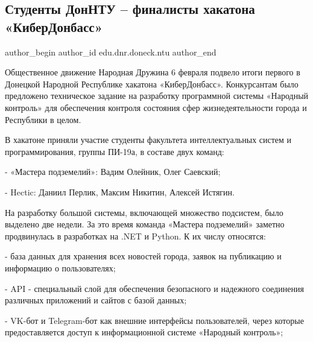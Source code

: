  
 
 
 
 
 
\subsection{Студенты ДонНТУ – финалисты хакатона «КиберДонбасс»}
\label{sec:16_02_2022.stz.edu.dnr.doneck.ntu.1.hakaton_studenty}
 
\ifcmt
 author_begin
   author_id edu.dnr.doneck.ntu
 author_end
\fi

Общественное движение Народная Дружина 6 февраля подвело итоги первого в
Донецкой Народной Республике хакатона «КиберДонбасс». Конкурсантам было
предложено техническое задание на разработку программной системы «Народный
контроль» для обеспечения контроля состояния сфер жизнедеятельности города и
Республики в целом.


В хакатоне приняли участие студенты факультета интеллектуальных систем и
программирования, группы ПИ-19а, в составе двух команд:

- «Мастера подземелий»: Вадим Олейник, Олег Саевский;

- Hectic: Даниил Перлик, Максим Никитин, Алексей Истягин.


На разработку большой системы, включающей множество подсистем, было выделено
две недели. За это время команда «Мастера подземелий» заметно продвинулась в
разработках на .NET и Python. К их числу относятся:

- база данных для хранения всех новостей города, заявок на публикацию и
информацию о пользователях;

- API - специальный слой для обеспечения безопасного и надежного соединения
различных приложений и сайтов с базой данных;

- VK-бот и Telegram-бот как внешние интерфейсы пользователей, через которые
предоставляется доступ к информационной системе «Народный контроль»;

